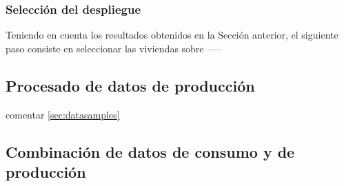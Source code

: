 \subsubsection{Selección del despliegue}

Teniendo en cuenta los resultados obtenidos en la Sección anterior, el siguiente paso consiste en seleccionar las viviendas sobre -----













\subsection{Procesado de datos de producción}

comentar \ref{sec:datasamples}









\subsection{Combinación de datos de consumo y de producción}



